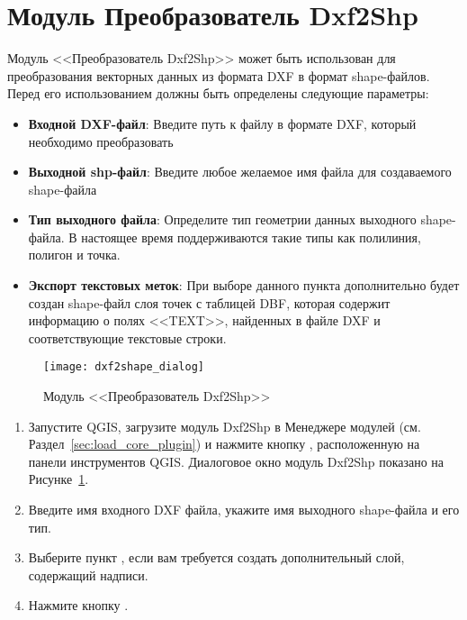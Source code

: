 
\section{Модуль Преобразователь Dxf2Shp}\label{dxf2shape}


Модуль <<Преобразователь Dxf2Shp>> может быть использован для преобразования
векторных данных из формата DXF в формат shape-файлов. Перед его
использованием должны быть определены следующие параметры:

\begin{itemize}
\item \textbf{Входной DXF-файл}: Введите путь к файлу в формате DXF,
который необходимо преобразовать
\item \textbf{Выходной shp-файл}: Введите любое желаемое имя файла для
создаваемого shape-файла
\item \textbf{Тип выходного файла}: Определите тип геометрии данных
выходного shape-файла. В настоящее время поддерживаются такие типы как
полилиния, полигон и точка.
\item \textbf{Экспорт текстовых меток}: При выборе данного пункта
дополнительно будет создан shape-файл слоя точек с
таблицей DBF, которая содержит информацию о полях <<TEXT>>, найденных в
файле DXF и соответствующие текстовые строки.
\end{itemize}

\begin{figure}[ht]
   \centering
   \texttt{[image: dxf2shape\_dialog]}
   \caption{Модуль <<Преобразователь Dxf2Shp>> \wincaption}\label{fig:dxf2shape_dialog}
\end{figure}


\begin{enumerate}
  \item Запустите QGIS, загрузите модуль Dxf2Shp в Менеджере модулей
  (см. Раздел~\ref{sec:load_core_plugin}) и нажмите кнопку
  , расположенную на
  панели инструментов QGIS. Диалоговое окно модуль Dxf2Shp показано на
  Рисунке~\ref{fig:dxf2shape_dialog}.
  \item Введите имя входного DXF файла, укажите имя выходного shape-файла
  и его тип.
  \item Выберите пункт , если вам
  требуется создать дополнительный слой, содержащий надписи.
  \item Нажмите кнопку .
\end{enumerate}

\FloatBarrier
